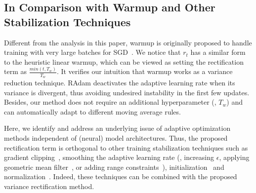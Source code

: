 \subsection{In Comparison with Warmup and Other Stabilization Techniques}
Different from the analysis in this paper,  warmup is originally proposed to handle training with very large batches for SGD~\citep{goyal2017accurate,gotmare2018a,bernstein2018signsgd,Xiao2017DSCOVRRP}.
We notice that $r_t$ has a similar form to the heuristic linear warmup, which can be viewed as setting the rectification term as $\frac{min(t, T_w)}{T_w}$. 
It verifies our intuition that warmup works as a variance reduction technique. 
RAdam deactivates the adaptive learning rate when its variance is divergent, thus avoiding undesired instability in the first few updates. 
Besides, our method does not require an additional hyperparameter (\ie, $T_w$) 
and can automatically adapt to different moving average rules. 

Here, we identify and address an underlying issue of adaptive optimization methods independent of (neural) model architectures.
Thus, the proposed rectification term is orthogonal to other training stabilization techniques such as  gradient clipping~\citep{bengio2013advances}, smoothing the adaptive learning rate (\ie, increasing $\epsilon$, applying geometric mean filter~\citep{chen2018closing}, or adding range constraints~\citep{luo2019adaptive}), initialization~\citep{balduzzi2017shattered,zhang2019fixup} and normalization~\citep{ba2016layer,ioffe2015batch}. 
Indeed, these techniques can be combined with the proposed variance rectification method.



